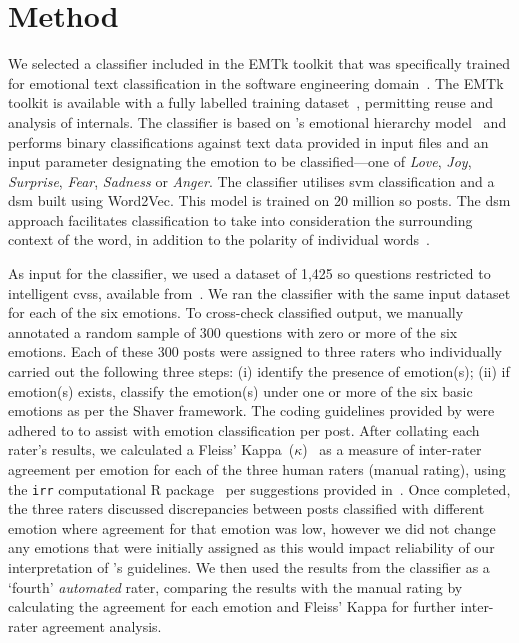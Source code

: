 \section{Method}\label{caise2021:sec:method}
We selected a classifier included in the EMTk toolkit that was specifically trained for emotional text classification in the software engineering domain~\citep{calefato2017}. The EMTk toolkit is available with a fully labelled training dataset~\citep{novielli2018}, permitting reuse and analysis of internals.  The classifier is based on \citeauthor{shaver1987}'s emotional hierarchy model~\citep{shaver1987} and performs binary classifications against text data provided in input files and an input parameter designating the emotion to be classified---one of \textit{Love}, \textit{Joy}, \textit{Surprise}, \textit{Fear}, \textit{Sadness} or \textit{Anger}. The classifier utilises \gls{svm} classification and a \gls{dsm} built using Word2Vec. This model is trained on 20 million \gls{so} posts. The \gls{dsm} approach facilitates classification to take into consideration the surrounding context of the word, in addition to the polarity of individual words~\citep{calefato2018}.   


As input for the classifier, we used a dataset of 1,425 \gls{so} questions restricted to intelligent \glspl{cvs}, available from~\citet{Cummaudo:2020icse}.  We ran the classifier with the same input dataset for each of the six emotions.
To cross-check classified output, we manually annotated a random sample of 300 questions with zero or more of the six emotions. Each of these 300 posts were assigned to three raters who individually carried out the following three steps: (i) identify the presence of emotion(s); (ii) if emotion(s) exists, classify the emotion(s) under one or more of the six basic emotions as per the Shaver framework. The coding guidelines provided by \citet{novielli2018} were adhered to to assist with emotion classification per post.  After collating each rater's results, we calculated a Fleiss' Kappa~($\kappa$)~\citep{Fleiss:1971ff} as a measure of inter-rater agreement per emotion for each of the three human raters (manual rating), using the \texttt{irr} computational R package~\citep{Gamer:tj} per suggestions provided in~\citep{Hallgren:2012kt}. Once completed, the three raters discussed discrepancies between posts classified with different emotion where agreement for that emotion was low, however we did not change any emotions that were initially assigned as this would impact reliability of our interpretation of \citet{novielli2018}'s guidelines. We then used the results from the classifier as a `fourth' \textit{automated} rater, comparing the results with the manual rating by calculating the agreement for each emotion and Fleiss' Kappa for further inter-rater agreement analysis.

